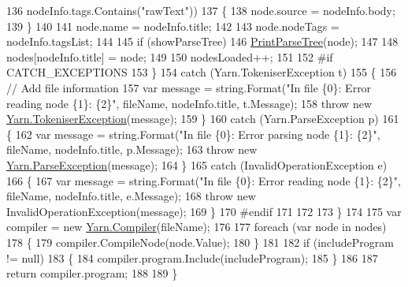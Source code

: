 \begin{DoxyCode}
136                         nodeInfo.tags.Contains(\textcolor{stringliteral}{"rawText"}))
137                     \{
138                         node.source = nodeInfo.body;
139                     \}
140 
141                     node.name = nodeInfo.title;
142 
143                     node.nodeTags = nodeInfo.tagsList;
144 
145                     \textcolor{keywordflow}{if} (showParseTree)
146                         \hyperlink{a00105_aa105ea8e5d65a420d1089616523feecc}{PrintParseTree}(node);
147 
148                     nodes[nodeInfo.title] = node;
149 
150                     nodesLoaded++;
151 
152 \textcolor{preprocessor}{#if CATCH\_EXCEPTIONS}
153 \textcolor{preprocessor}{}                \}
154                 \textcolor{keywordflow}{catch} (Yarn.TokeniserException t)
155                 \{
156                     \textcolor{comment}{// Add file information}
157                     var message = string.Format(\textcolor{stringliteral}{"In file \{0\}: Error reading node \{1\}: \{2\}"}, fileName, 
      nodeInfo.title, t.Message);
158                     \textcolor{keywordflow}{throw} \textcolor{keyword}{new} \hyperlink{a00148}{Yarn.TokeniserException}(message);
159                 \}
160                 \textcolor{keywordflow}{catch} (Yarn.ParseException p)
161                 \{
162                     var message = string.Format(\textcolor{stringliteral}{"In file \{0\}: Error parsing node \{1\}: \{2\}"}, fileName, 
      nodeInfo.title, p.Message);
163                     \textcolor{keywordflow}{throw} \textcolor{keyword}{new} \hyperlink{a00119}{Yarn.ParseException}(message);
164                 \}
165                 \textcolor{keywordflow}{catch} (InvalidOperationException e)
166                 \{
167                     var message = string.Format(\textcolor{stringliteral}{"In file \{0\}: Error reading node \{1\}: \{2\}"}, fileName, 
      nodeInfo.title, e.Message);
168                     \textcolor{keywordflow}{throw} \textcolor{keyword}{new} InvalidOperationException(message);
169                 \}
170 \textcolor{preprocessor}{#endif}
171 \textcolor{preprocessor}{}
172 
173             \}
174 
175             var compiler = \textcolor{keyword}{new} \hyperlink{a00032}{Yarn.Compiler}(fileName);
176 
177             \textcolor{keywordflow}{foreach} (var node \textcolor{keywordflow}{in} nodes)
178             \{
179                 compiler.CompileNode(node.Value);
180             \}
181 
182             \textcolor{keywordflow}{if} (includeProgram != null)
183             \{
184                 compiler.program.Include(includeProgram);
185             \}
186 
187             \textcolor{keywordflow}{return} compiler.program;
188 
189         \}
\end{DoxyCode}
